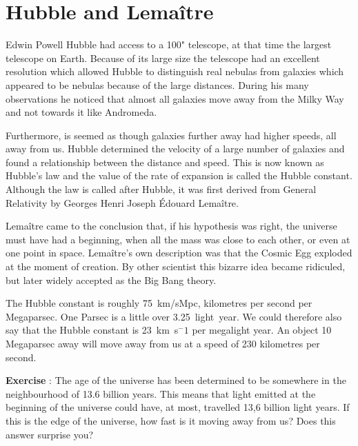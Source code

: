 \documentclass[12pt,a4paper]{article}
\numberwithin{equation}{section}
\numberwithin{figure}{section}
\newcounter{Exercise}
\numberwithin{table}{section}
\begin{document}
\section{Hubble and Lema\^itre}
Edwin Powell Hubble had access to a 100" telescope, at that time the largest telescope on Earth. Because of its large size the telescope had an excellent resolution which allowed Hubble to distinguish real nebulas from galaxies which appeared to be nebulas because of the large distances. During his many observations he noticed that almost all galaxies move away from the Milky Way and not towards it like Andromeda.

Furthermore, is seemed as though galaxies further away had higher speeds, all away from us. Hubble determined the velocity of a large number of galaxies and found a relationship between the distance and speed. This is now known as Hubble's law and the value of the rate of expansion is called the Hubble constant. Although the law is called after Hubble, it was first derived from General Relativity by Georges Henri Joseph \'Edouard Lema\^itre.

Lema\^itre came to the conclusion that, if his hypothesis was right, the universe must have had a beginning, when all the mass was close to each other, or even at one point in space. Lema\^itre's own description was that the Cosmic Egg exploded at the moment of creation. By other scientist this bizarre idea became ridiculed, but later widely accepted as the Big Bang theory.

The Hubble constant is roughly 75~km/sMpc, kilometres per second per Megaparsec. One Parsec is a little over 3.25~light~year. We could therefore also say that the Hubble constant is 23~km~s$^-1$ per megalight year. An object 10 Megaparsec away will move away from us at a speed of 230 kilometres per second.

\begin{shaded}
\textbf{Exercise \theExercise {}} : The age of the universe has been determined to be somewhere in the neighbourhood of 13.6 billion years. This means that light emitted at the beginning of the universe could have, at most, travelled 13,6 billion light years. If this is the edge of the universe, how fast is it moving away from us? Does this answer surprise you?\end{shaded}
\end{document}

